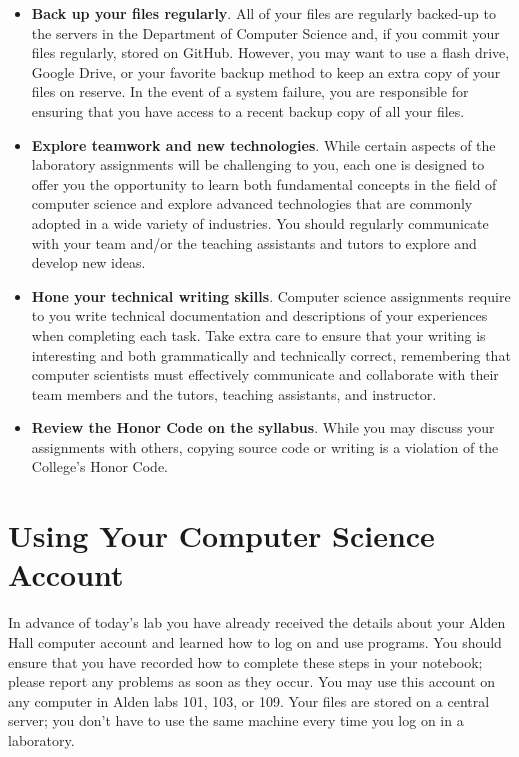 \documentclass[11pt]{article}
\begin{document}
\begin{itemize}
\item {\bf Back up your files regularly}. All of your files are regularly backed-up to the servers in the Department of
  Computer Science and, if you commit your files regularly, stored on GitHub. However, you may want to use a flash
  drive, Google Drive, or your favorite backup method to keep an extra copy of your files on reserve. In the event of a
  system failure, you are responsible for ensuring that you have access to a recent backup copy of all your files.

\item {\bf Explore teamwork and new technologies}. While certain aspects of the laboratory assignments will be
  challenging to you, each one is designed to offer you the opportunity to learn both fundamental concepts in the field
  of computer science and explore advanced technologies that are commonly adopted in a wide variety of industries. You
  should regularly communicate with your team and/or the teaching assistants and tutors to explore and develop new
  ideas.

\item {\bf Hone your technical writing skills}. Computer science assignments require to you write technical
  documentation and descriptions of your experiences when completing each task. Take extra care to ensure that your
  writing is interesting and both grammatically and technically correct, remembering that computer scientists must
  effectively communicate and collaborate with their team members and the tutors, teaching assistants, and instructor.

\item {\bf Review the Honor Code on the syllabus}. While you may discuss your assignments with others, copying source
  code or writing is a violation of the College's Honor Code.

\end{itemize}

\section*{Using Your Computer Science Account}

In advance of today's lab you have already received the details about your Alden Hall computer account and learned how
to log on and use programs. You should ensure that you have recorded how to complete these steps in your notebook;
please report any problems as soon as they occur. You may use this account on any computer in Alden labs 101, 103, or
109. Your files are stored on a central server; you don't have to use the same machine every time you log on in a
laboratory.
\end{document}

